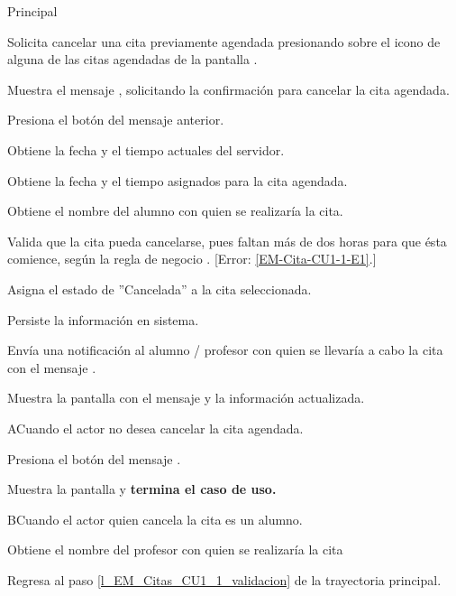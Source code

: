 \begin{UCtrayectoria}{Principal}

	\UCpaso [\UCactor] Solicita cancelar una cita previamente agendada presionando sobre el icono  de alguna de las citas agendadas de la pantalla .

	\UCpaso Muestra el mensaje , solicitando la confirmación para cancelar la cita agendada. 

	\UCpaso Presiona el botón  del mensaje anterior.  
 
	\UCpaso Obtiene la fecha y el tiempo actuales del servidor.

	\UCpaso Obtiene la fecha y el tiempo asignados para la cita agendada.

	\UCpaso Obtiene el nombre del alumno con quien se realizaría la cita. 

	\UCpaso Valida que la cita pueda cancelarse, pues faltan más de dos horas para que ésta comience, según la regla de negocio . [Error: \ref{EM-Cita-CU1-1-E1}.] \label{l_EM_Citas_CU1_1_validacion}

	\UCpaso Asigna el estado de ''Cancelada'' a la cita seleccionada. 

	\UCpaso Persiste la información en sistema. 

	\UCpaso Envía una notificación al alumno / profesor con quien se llevaría a cabo la cita con el mensaje .

	\UCpaso Muestra la pantalla  con el mensaje  y la información actualizada.
	
\end{UCtrayectoria}

\begin{UCtrayectoriaA}{A}{Cuando el actor no desea cancelar la cita agendada.}

	\UCpaso Presiona el botón  del mensaje .

	\UCpaso Muestra la pantalla  y \textbf{termina el caso de uso.}

\end{UCtrayectoriaA}

\begin{UCtrayectoriaA}{B}{Cuando el actor quien cancela la cita es un alumno.}

	\UCpaso Obtiene el nombre del profesor con quien se realizaría la cita

	\UCpaso Regresa al paso \ref{l_EM_Citas_CU1_1_validacion} de la trayectoria principal.

\end{UCtrayectoriaA}